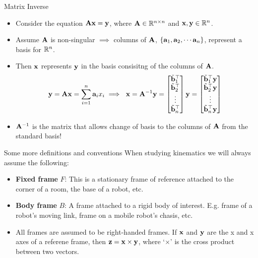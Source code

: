 \documentclass[aspectratio=169]{beamer}
\begin{document}
\begin{frame}[t]{Matrix Inverse}
\begin{itemize}
    \item Consider the equation $\mathbf{Ax} = \mathbf{y}$, where $\mathbf{A} \in \mathbb{R}^{n \times n}$ and $\mathbf{x}, \mathbf{y} \in \mathbb{R}^n$. 

    \item Assume $\mathbf{A}$ is non-singular $\implies$ columns of $\mathbf{A}$, $\left\{ \mathbf{a}_1, \mathbf{a}_2, \cdots \mathbf{a}_n\right\}$, represent a basis for $\mathbb{R}^n$.

    \item Then $\mathbf{x}$ represents $\mathbf{y}$ in the basis consisitng of the columns of $\mathbf{A}$.
    \[ \mf{y} = \mf{Ax} = \sum_{i=1}^{n}\mf{a}_i x_i \implies \,\, \mf{x} = \mf{A}^{-1}\mf{y} = \begin{bmatrix*}\tilde{\mf{b}}_1^\top \\ \tilde{\mf{b}}_2^\top \\ \vdots \\ \tilde{\mf{b}}_n^\top\end{bmatrix*}\mf{y} = \begin{bmatrix*}\tilde{\mf{b}}_1^\top\mf{y} \\ \tilde{\mf{b}}_2^\top\mf{y} \\ \vdots \\ \tilde{\mf{b}}_n^\top\mf{y}\end{bmatrix*} \]
    \item $\mathbf{A}^{-1}$ is the matrix that allows change of basis to the columns of $\mathbf{A}$ from the standard basis!
  \end{itemize}
\end{frame}


\begin{frame}{Some more definitions and conventions}
  When studying kinematics we will always assume the following:
  \begin{itemize}
    \item \textbf{Fixed frame} $F$: This is a stationary frame of reference attached to the corner of a room, the base of a robot, etc.
    \item \textbf{Body frame} $B$: A frame attached to a rigid body of interest. E.g. frame of a robot's moving link, frame on a mobile robot's chasis, etc.
    \item All frames are assumed to be right-handed frames. If $\mathbf{x}$ and $\mathbf{y}$ are the x and x axes of a referene frame, then $\mathbf{z} = \mathbf{x} \times \mathbf{y}$, where `$\times$' is the cross product between two vectors.
  \end{itemize}
\end{frame}
\end{document}
